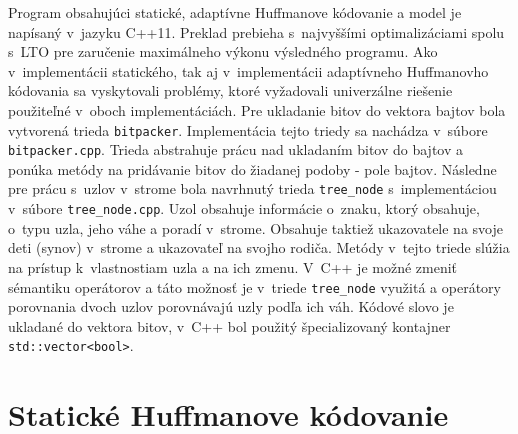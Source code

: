 \documentclass[10pt,a4paper]{article}
\begin{document}
Program obsahujúci statické, adaptívne Huffmanove kódovanie a model je napísaný v~jazyku C++11. Preklad prebieha s~najvyššími optimalizáciami spolu s~LTO pre zaručenie maximálneho výkonu výsledného programu. Ako v~implementácii statického, tak aj v~implementácii adaptívneho Huffmanovho kódovania sa vyskytovali problémy, ktoré vyžadovali univerzálne riešenie použiteľné v~oboch implementáciách. Pre ukladanie bitov do vektora bajtov bola vytvorená trieda \texttt{bitpacker}. Implementácia tejto triedy sa nachádza v~súbore \texttt{bitpacker.cpp}. Trieda abstrahuje prácu nad ukladaním bitov do bajtov a ponúka metódy na pridávanie bitov do žiadanej podoby \-- pole bajtov. Následne pre prácu s~uzlov v~strome bola navrhnutý trieda \texttt{tree\_node} s~implementáciou v~súbore \texttt{tree\_node.cpp}. Uzol obsahuje informácie o~znaku, ktorý obsahuje, o~typu uzla, jeho váhe a poradí v~strome. Obsahuje taktiež ukazovatele na svoje deti (synov) v~strome a ukazovateľ na svojho rodiča. Metódy v~tejto triede slúžia na prístup k~vlastnostiam uzla a na ich zmenu. V~C++ je možné zmeniť sémantiku operátorov a táto možnosť je v~triede \texttt{tree\_node} využitá a operátory porovnania dvoch uzlov porovnávajú uzly podľa ich váh. Kódové slovo je ukladané do vektora bitov, v~C++ bol použitý špecializovaný kontajner \texttt{std::vector<bool>}.

\section{Statické Huffmanove kódovanie}
\end{document}
